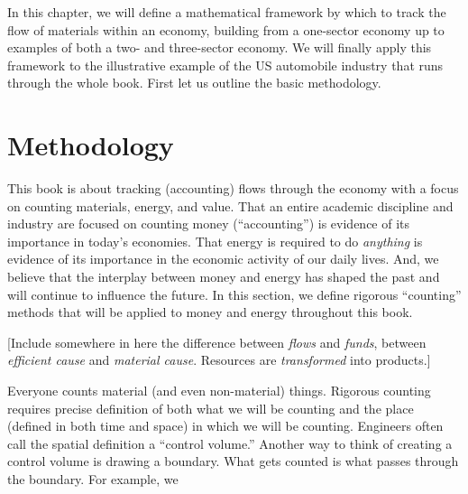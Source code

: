 In this chapter, we will define a mathematical framework by which to track the flow of
materials within an economy, building from a one-sector economy up to examples of both a
two- and three-sector economy. We will finally apply this framework to the illustrative
example of the US automobile industry that runs through the whole book. First let us
outline the basic methodology.

\section{Methodology}
\label{sec:Materials_Methodology}



This book is about tracking (accounting) flows through the 
economy with a focus on counting materials, energy, and value.
That an entire academic discipline and industry are focused on counting money (``accounting'')
is evidence of its importance in today's economies.
That energy is required to do \emph{anything} is evidence 
of its importance in the economic activity of our daily lives.
And, we believe that the interplay between money and energy
has shaped the past and will continue to influence the future.
In this section, we define rigorous ``counting'' methods that will be applied
to money and energy throughout this book.

[Include somewhere in here the difference between \emph{flows} and \emph{funds}, 
between \emph{efficient cause} and \emph{material cause}. Resources are 
\emph{transformed} into products.]

Everyone counts material (and even non-material) things. 
Rigorous counting requires precise definition of both 
what we will be counting
and the place (defined in both time and space) in which we will be counting. 
Engineers often call the spatial definition a ``control volume.'' 
Another way to think of creating a
control volume is drawing a boundary. 
What gets counted is what passes through the boundary.
For example, we 

